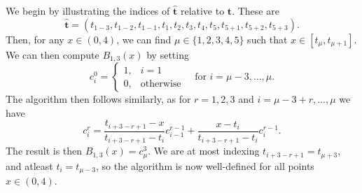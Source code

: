 \begin{solution}
    We begin by illustrating the indices of $\hat{\mathbf{t}}$ relative to $\mathbf{t}$.
    These are
    \begin{equation*}
        \hat{\mathbf{t}} = (t_{1-3}, t_{1-2}, t_{1-1}, t_1, t_2, t_3, t_4, t_5, t_{5+1}, t_{5+2}, t_{5+3}).
    \end{equation*}
    Then, for any $x \in (0, 4)$, we can find $\mu \in \{1, 2, 3, 4, 5\}$ such that $x \in [t_\mu, t_{\mu+1}]$.
    We can then compute $B_{1, 3}(x)$ by setting
    \begin{equation*}
        c_i^0 =
        \begin{cases}
            1, & i = 1 \\
            0, & \text{otherwise}
        \end{cases}
        \quad \text{for } i = \mu - 3, \ldots, \mu.
    \end{equation*}
    The algorithm then follows similarly, as for $r = 1, 2, 3$ and $i = \mu - 3 + r, \ldots, \mu$ we have
    \begin{equation*}
        c_i^r
        = \frac{t_{i+3-r+1} - x}{t_{i+3-r+1} - t_i} c_{i-1}^{r-1}
        + \frac{x - t_i}{t_{i+3-r+1} - t_{i}} c_{i}^{r-1}.
    \end{equation*}
    The result is then $B_{1, 3}(x) = c_{\mu}^3$.
    We are at most indexing $t_{i+3-r+1} = t_{\mu + 3}$, and atleast $t_i = t_{\mu - 3}$, so the algorithm is now well-defined for all points $x \in (0, 4)$.
\end{solution}
